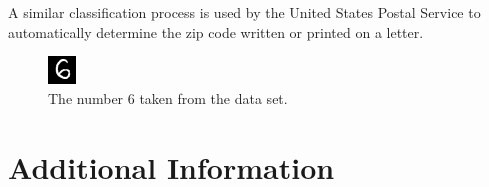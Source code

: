 \begin{problem}

A similar classification process is used by the United States Postal Service to automatically determine the zip code written or printed on a letter.

\begin{figure}[H]
\includegraphics[width=.25\textwidth]{figures/Example.png}
\caption{The number 6 taken from the data set.}
\label{fig:digit}
\end{figure}
\end{problem}

\section*{Additional Information}
